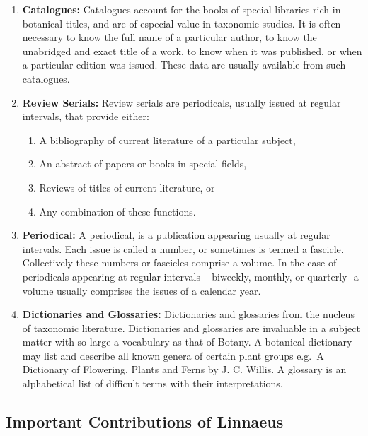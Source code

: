 \documentclass[
]{book}
\providecommand{\tightlist}{%
  \setlength{\itemsep}{0pt}\setlength{\parskip}{0pt}}
\begin{document}
\begin{enumerate}
\item
  \textbf{Catalogues:} Catalogues account for the books of special libraries rich in botanical titles, and are of especial value in taxonomic studies. It is often necessary to know the full name of a particular author, to know the unabridged and exact title of a work, to know when it was published, or when a particular edition was issued. These data are usually available from such catalogues.
\item
  \textbf{Review Serials:} Review serials are periodicals, usually issued at regular intervals, that provide either:

  \begin{enumerate}
  \def\labelenumii{\roman{enumii})}
  \tightlist
  \item
    A bibliography of current literature of a particular subject,
  \item
    An abstract of papers or books in special fields,
  \item
    Reviews of titles of current literature, or
  \item
    Any combination of these functions.
  \end{enumerate}
\item
  \textbf{Periodical:} A periodical, is a publication appearing usually at regular intervals. Each issue is called a number, or sometimes is termed a fascicle. Collectively these numbers or fascicles comprise a volume. In the case of periodicals appearing at regular intervals -- biweekly, monthly, or quarterly- a volume usually comprises the issues of a calendar year.
\item
  \textbf{Dictionaries and Glossaries:} Dictionaries and glossaries from the nucleus of taxonomic literature. Dictionaries and glossaries are invaluable in a subject matter with so large a vocabulary as that of Botany. A botanical dictionary may list and describe all known genera of certain plant groups e.g.~A Dictionary of Flowering, Plants and Ferns by J. C. Willis. A glossary is an alphabetical list of difficult terms with their interpretations.
\end{enumerate}

\hypertarget{important-contributions-of-linnaeus}{%
\subsection{Important Contributions of Linnaeus}\label{important-contributions-of-linnaeus}}
\end{document}
